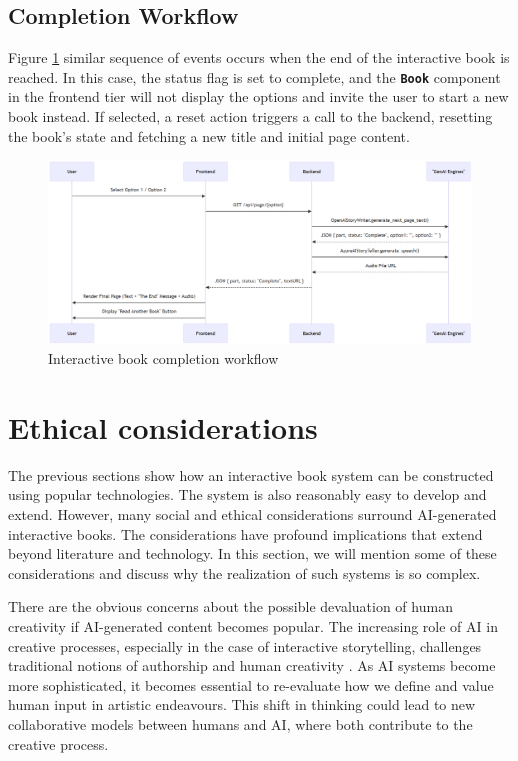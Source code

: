 \documentclass[conference]{IEEEtran}
\begin{document}
	\subsection{Completion Workflow}
	
	Figure \ref{fig:img-ari3333-completion-workflow} similar sequence of events occurs when the end of the interactive book is reached. In this case, the status flag is set to complete, and the \textbf{\texttt{Book}} component in the frontend tier will not display the options and invite the user to start a new book instead. If selected, a reset action triggers a call to the backend, resetting the book's state and fetching a new title and initial page content.
	
	\begin{figure}[H]
		\centering
		\includegraphics[width=0.7\linewidth]{img/img-ARI3333-completion-workflow}
		\caption{Interactive book completion workflow}
		\label{fig:img-ari3333-completion-workflow}
	\end{figure}
	
	
	\section{Ethical considerations}
		
	The previous sections show how an interactive book system can be constructed using popular technologies. The system is also reasonably easy to develop and extend. However, many social and ethical considerations surround AI-generated interactive books. The considerations have profound implications that extend beyond literature and technology. In this section, we will mention some of these considerations and discuss why the realization of such systems is so complex.
	
	There are the obvious concerns about the possible devaluation of human creativity if AI-generated content becomes popular. The increasing role of AI in creative processes, especially in the case of interactive storytelling, challenges traditional notions of authorship and human creativity \cite{udhayakumarexploring}. As AI systems become more sophisticated, it becomes essential to re-evaluate how we define and value human input in artistic endeavours. This shift in thinking could lead to new collaborative models between humans and AI, where both contribute to the creative process\cite{udhayakumarexploring}.
		
\end{document}
